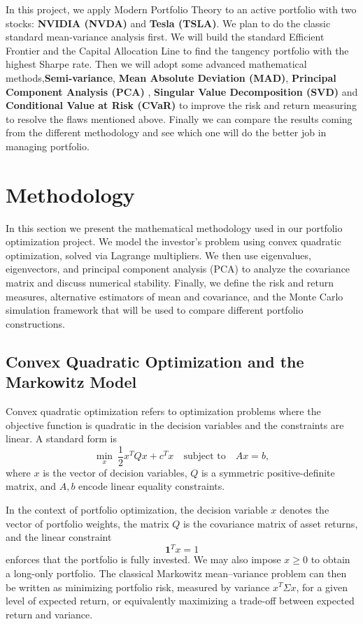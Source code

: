 \documentclass[12pt]{article}
\begin{document}
In this project, we apply Modern Portfolio Theory to an active portfolio with two stocks: \textbf{NVIDIA (NVDA)} and \textbf{Tesla (TSLA)}. We plan to do the classic standard mean-variance analysis first. We will build the standard Efficient Frontier and the Capital Allocation Line to find the tangency portfolio with the highest Sharpe rate.  Then we will adopt some advanced mathematical methods,\textbf{Semi-variance}, \textbf{Mean Absolute Deviation (MAD)}, \textbf{Principal Component Analysis (PCA)} , \textbf{Singular Value Decomposition (SVD)} and \textbf{Conditional Value at Risk (CVaR)} to improve the risk and return measuring to resolve the flaws mentioned above. Finally we can compare the results coming from the different methodology and see which one will do the better job in managing portfolio.


\section{Methodology}

In this section we present the mathematical methodology used in our portfolio optimization project. We model the investor's problem using convex quadratic optimization, solved via Lagrange multipliers. We then use eigenvalues, eigenvectors, and principal component analysis (PCA) to analyze the covariance matrix and discuss numerical stability. Finally, we define the risk and return measures, alternative estimators of mean and covariance, and the Monte Carlo simulation framework that will be used to compare different portfolio constructions.

\subsection{Convex Quadratic Optimization and the Markowitz Model}

Convex quadratic optimization refers to optimization problems where the objective function is quadratic in the decision variables and the constraints are linear. A standard form is
\begin{equation}
    \min_{x} \ \frac{1}{2} x^{T} Q x + c^{T} x 
    \quad \text{subject  to} \quad 
    A x = b,
\end{equation}
where $x$ is the vector of decision variables, $Q$ is a symmetric positive-definite matrix, and $A, b$ encode linear equality constraints.

In the context of portfolio optimization, the decision variable $x$ denotes the vector of portfolio weights, the matrix $Q$ is the covariance matrix of asset returns, and the linear constraint
\begin{equation}
    \mathbf{1}^{T} x = 1
\end{equation}
enforces that the portfolio is fully invested. We may also impose $x \ge 0$ to obtain a long-only portfolio. The classical Markowitz mean--variance problem can then be written as minimizing portfolio risk, measured by variance $x^{T} \Sigma x$, for a given level of expected return, or equivalently maximizing a trade-off between expected return and variance.
\end{document}
